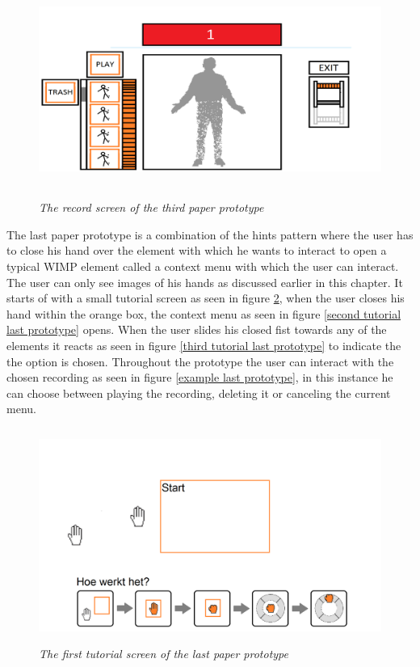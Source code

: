 \begin{figure}[H]
	\begin{center}
		\includegraphics[width=12.5cm, height=7cm]{figures/prototype_6_3_record.png}
		\caption{\emph{The record screen of the third paper prototype}}
		\label{record third prototype}
	\end{center}
\end{figure}

The last paper prototype is a combination of the hints pattern where the user has to close his hand over the element with which he wants to interact to open a typical WIMP element called a context menu with which the user can interact. The user can only see images of his hands as discussed earlier in this chapter. It starts of with a small tutorial screen as seen in figure \ref{first tutorial last prototype}, when the user closes his hand within the orange box, the context menu as seen in figure \ref{second tutorial last prototype} opens. When the user slides his closed fist towards any of the elements it reacts as seen in figure \ref{third tutorial last prototype} to indicate the the option is chosen. Throughout the prototype the user can interact with the chosen recording as seen in figure \ref{example last prototype}, in this instance he can choose between playing the recording, deleting it or canceling the current menu.\\

\begin{figure}[H]
	\begin{center}
		\includegraphics[width=12.5cm, height=7cm]{figures/prototype_7_6_tutorial_1.png}
		\caption{\emph{The first tutorial screen of the last paper prototype}}
		\label{first tutorial last prototype}
	\end{center}
\end{figure}

